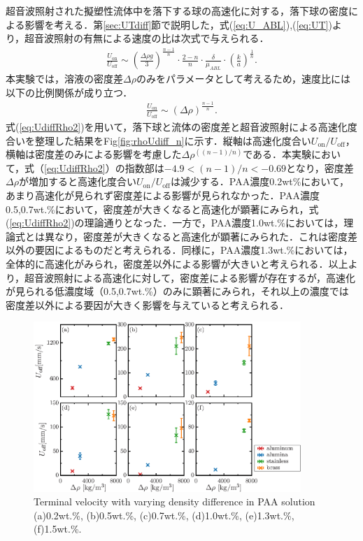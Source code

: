 超音波照射された擬塑性流体中を落下する球の高速化に対する，落下球の密度による影響を考える．第\ref{sec:UTdiff}節で説明した，式(\ref{eq:U_ABL}),(\ref{eq:UT})より，超音波照射の有無による速度の比は次式で与えられる．
\begin{eqnarray}
    \frac{U_\text{on}}{U_\text{off}} \sim \left(\frac{\Delta\rho{}g}{3}\right)^{\frac{n-1}{n}}\cdot\frac{2-n}{n}\cdot\frac{\delta}{\mu_{ABL}}\cdot\left(\frac{k}{a}\right)^{\frac{1}{n}} .
    \label{eq:UdiffRho}
\end{eqnarray}
本実験では，溶液の密度差$\Delta\rho$のみをパラメータとして考えるため，速度比には以下の比例関係が成り立つ．
\begin{eqnarray}
    \frac{U_\text{on}}{U_\text{off}} \sim \left(\Delta\rho{}\right)^{\frac{n-1}{n}} .
    \label{eq:UdiffRho2}
\end{eqnarray}
式(\ref{eq:UdiffRho2})を用いて，落下球と流体の密度差と超音波照射による高速化度合いを整理した結果をFig\ref{fig:rhoUdiff_n}に示す．縦軸は高速化度合い$U_\text{on}/U_\text{off}$，横軸は密度差のみによる影響を考慮した$\Delta\rho^{\left(\left(n-1\right)/n\right)}$である．本実験において，式（\ref{eq:UdiffRho2}）の指数部は$-4.9<(n-1)/n<-0.69$となり，密度差$\Delta\rho$が増加すると高速化度合い$U_\text{on}/U_\text{off}$は減少する．PAA濃度0.2wt\%において，あまり高速化が見られず密度差による影響が見られなかった．PAA濃度0.5,0.7wt.\%において，密度差が大きくなると高速化が顕著にみられ，式(\ref{eq:UdiffRho2})の理論通りとなった．一方で，PAA濃度1.0wt.\%においては，理論式とは異なり，密度差が大きくなると高速化が顕著にみられた．これは密度差以外の要因によるものだと考えられる．同様に，PAA濃度1.3wt.\%においては，全体的に高速化がみられ，密度差以外による影響が大きいと考えられる．以上より，超音波照射による高速化に対して，密度差による影響が存在するが，高速化が見られる低濃度域（0.5,0.7wt.\%）のみに顕著にみられ，それ以上の濃度では密度差以外による要因が大きく影響を与えていると考えられる．

\begin{figure}[ht]
    \centering
    \includegraphics[width=0.9\textwidth]{./5-Results/rhoUT.eps}
    \caption{Terminal velocity with varying density difference in PAA solution (a)0.2wt.\%, (b)0.5wt.\%, (c)0.7wt.\%, (d)1.0wt.\%, (e)1.3wt.\%, (f)1.5wt.\%.}
    \label{fig:rhoUT}
\end{figure}

